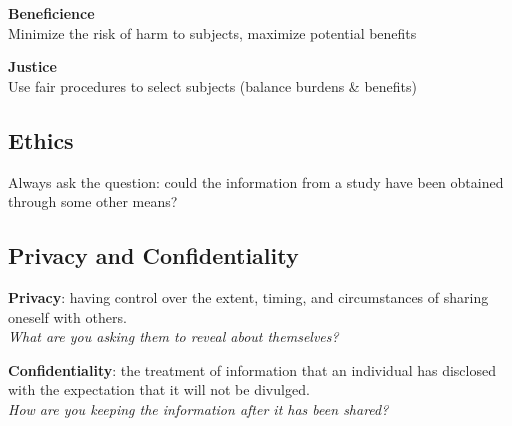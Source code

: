 \textbf{Beneficience}\\
Minimize the risk of harm to subjects, maximize potential benefits

\textbf{Justice}\\
Use fair procedures to select subjects (balance burdens \& benefits)

\subsection{Ethics}
Always ask the question: could the information from a study have been obtained through some other means?

\subsection{Privacy and Confidentiality}
\textbf{Privacy}: having control over the extent, timing, and circumstances of sharing oneself with others.\\
\textit{What are you asking them to reveal about themselves?}

\textbf{Confidentiality}: the treatment of information that an individual has disclosed with the expectation that it will not be divulged.\\
\textit{How are you keeping the information after it has been shared?}
